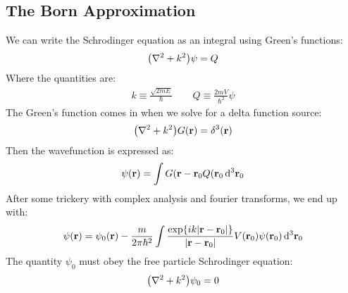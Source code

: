 \subsection{The Born Approximation}
We can write the Schrodinger equation as an integral using Green's functions:
\begin{align*}
  \qty(\laplacian+k^2)\psi=Q
\end{align*}
Where the quantities are:
\begin{align*}
  k\equiv\frac{\sqrt{2mE}}{\hbar}\qquad Q\equiv\frac{2mV}{\hbar^2}\psi
\end{align*}
The Green's function comes in when we solve for a delta function source:
\begin{align*}
  \qty(\laplacian+k^2)G(\vb{r})=\delta^3(\vb{r})
\end{align*}
Then the wavefunction is expressed as:
\begin{align*}
  \psi(\vb{r})=\int G(\vb{r}-\vb{r}_0Q(\vb{r}_0\dd[3]{\vb{r}_0}
\end{align*}
After some trickery with complex analysis and fourier transforms, we end up with:
\begin{align*}
  \psi(\vb{r})=\psi_0(\vb{r})-\frac{m}{2\pi\hbar^2}
  \int\frac{\exp{ik\abs{\vb{r}-\vb{r}_0}}}{\abs{\vb{r}-\vb{r}_0}}
  V(\vb{r}_0)\psi(\vb{r}_0)\dd[3]{\vb{r}_0}  
\end{align*}
The quantity $\psi_0$ must obey the free particle Schrodinger equation:
\begin{align*}
  \qty(\laplacian+k^2)\psi_0=0
\end{align*}
